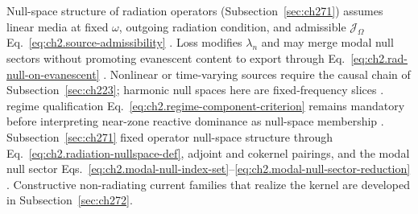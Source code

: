 Null-space structure of radiation operators (Subsection~\ref{sec:ch271}) assumes linear media at fixed \(\omega\),
outgoing radiation condition, and admissible \(\mathcal{J}_\Omega\) Eq.~\eqref{eq:ch2.source-admissibility}
\cite{stratton1941}. Loss modifies \(\lambda_n\) and may merge modal null sectors
without promoting evanescent content to export through
Eq.~\eqref{eq:ch2.rad-null-on-evanescent} \cite{stratton1941}. Nonlinear or time-varying
sources require the causal chain of Subsection~\ref{sec:ch223}; harmonic null spaces here are
fixed-frequency slices \cite{harrington2001}. regime qualification
Eq.~\eqref{eq:ch2.regime-component-criterion} remains mandatory before interpreting near-zone
reactive dominance as null-space membership \cite{stratton1941}.
\medskip
\noindent
Subsection~\ref{sec:ch271} fixed operator null-space structure through
Eq.~\eqref{eq:ch2.radiation-nullspace-def}, adjoint and cokernel pairings, and the modal null
sector Eqs.~\eqref{eq:ch2.modal-null-index-set}--\eqref{eq:ch2.modal-null-sector-reduction}
\cite{stratton1941}. Constructive non-radiating current families that realize the kernel are
developed in Subsection~\ref{sec:ch272}.
